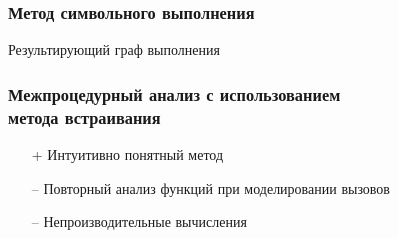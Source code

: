 \documentclass[hyperref={pdfpagelabels=false}]{beamer}
\begin{document}
\begin{frame}
\frametitle{Метод символьного выполнения}
Результирующий граф выполнения
\begin{figure}[h]
\end{figure}
\end{frame}
\begin{frame}
\frametitle{Межпроцедурный анализ с использованием\\метода встраивания}
\begin{itemize}
 \item[+] Интуитивно понятный метод
 \item[--] Повторный анализ функций при моделировании вызовов
 \item[--] Непроизводительные вычисления
\end{itemize}
\end{frame}
\end{document}
